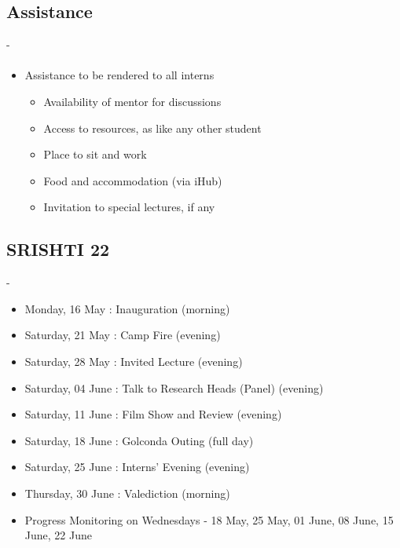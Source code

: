 \subsection{Assistance}

\begin{frame}[fragile=singleslide]{\insertsectionhead - \insertsubsectionhead}
 \framesubtitle{\insertsubsectionhead}
\begin{center}
\begin{itemize}
\item Assistance to be rendered to all interns
\begin{itemize}
\item Availability of mentor for discussions
\item Access to resources, as like any other student
\item Place to sit and work
\item Food and accommodation (via iHub)
\item Invitation to special lectures, if any
\end{itemize}
\end{itemize}
\end{center}
\end{frame}

\subsection{SRISHTI 22}

\begin{frame}[fragile=singleslide]{\insertsectionhead - \insertsubsectionhead}
\begin{center}
\begin{itemize}
\item Monday,	16 May	:	Inauguration	(morning)			
\item Saturday,	21 May	:	Camp Fire	(evening)			
\item Saturday,	28 May	:	Invited Lecture	(evening)			
\item Saturday,	04 June	:	Talk to Research Heads (Panel)	(evening)				
\item Saturday,	11 June	:	Film Show and Review	(evening)			
\item Saturday,	18 June	:	Golconda Outing	(full day)			
\item Saturday,	25 June	:	Interns’ Evening	(evening)		
\item Thursday,	30 June	:	Valediction	(morning)	
\item Progress Monitoring on Wednesdays - 18 May, 25  May, 01 June, 08 June, 15 June, 22 June	 
\end{itemize}
\end{center}
\end{frame}




%
